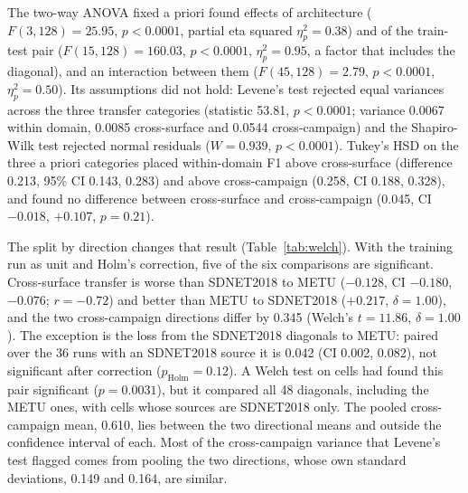 \documentclass[pdflatex,sn-apa]{sn-jnl}
\begin{document}
The two-way ANOVA fixed a priori found effects of architecture ($F(3,128)=25.95$, $p<0.0001$, partial eta squared $\eta^2_p=0.38$) and of the train-test pair ($F(15,128)=160.03$, $p<0.0001$, $\eta^2_p=0.95$, a factor that includes the diagonal), and an interaction between them ($F(45,128)=2.79$, $p<0.0001$, $\eta^2_p=0.50$). Its assumptions did not hold: Levene's test rejected equal variances across the three transfer categories (statistic 53.81, $p<0.0001$; variance 0.0067 within domain, 0.0085 cross-surface and 0.0544 cross-campaign) and the Shapiro-Wilk test rejected normal residuals ($W=0.939$, $p<0.0001$). Tukey's HSD on the three a priori categories placed within-domain F1 above cross-surface (difference 0.213, 95\% CI 0.143, 0.283) and above cross-campaign (0.258, CI 0.188, 0.328), and found no difference between cross-surface and cross-campaign (0.045, CI $-0.018$, $+0.107$, $p=0.21$).

The split by direction changes that result (Table~\ref{tab:welch}). With the training run as unit and Holm's correction, five of the six comparisons are significant. Cross-surface transfer is worse than SDNET2018 to METU ($-0.128$, CI $-0.180$, $-0.076$; $r=-0.72$) and better than METU to SDNET2018 ($+0.217$, $\delta=1.00$), and the two cross-campaign directions differ by 0.345 (Welch's $t=11.86$, $\delta=1.00$). The exception is the loss from the SDNET2018 diagonals to METU: paired over the 36 runs with an SDNET2018 source it is 0.042 (CI 0.002, 0.082), not significant after correction ($p_\mathrm{Holm}=0.12$). A Welch test on cells had found this pair significant ($p=0.0031$), but it compared all 48 diagonals, including the METU ones, with cells whose sources are SDNET2018 only. The pooled cross-campaign mean, 0.610, lies between the two directional means and outside the confidence interval of each. Most of the cross-campaign variance that Levene's test flagged comes from pooling the two directions, whose own standard deviations, 0.149 and 0.164, are similar.
\end{document}
